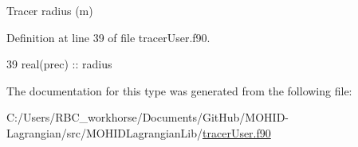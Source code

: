 Tracer radius (m) 



Definition at line 39 of file tracer\+User.\+f90.


\begin{DoxyCode}
39         \textcolor{keywordtype}{real(prec)} :: radius
\end{DoxyCode}


The documentation for this type was generated from the following file\+:\begin{DoxyCompactItemize}
\item 
C\+:/\+Users/\+R\+B\+C\+\_\+workhorse/\+Documents/\+Git\+Hub/\+M\+O\+H\+I\+D-\/\+Lagrangian/src/\+M\+O\+H\+I\+D\+Lagrangian\+Lib/\mbox{\hyperlink{tracer_user_8f90}{tracer\+User.\+f90}}\end{DoxyCompactItemize}
